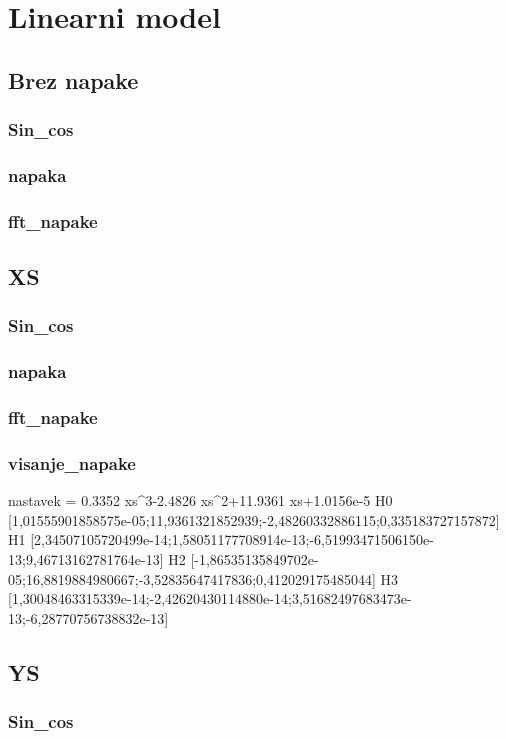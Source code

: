 \chapter{Linearni model}
\section{Brez napake}
\subsection{Sin\_cos}
\subsection{napaka}
\subsection{fft\_napake}
\section{XS}
\subsection{Sin\_cos}
\subsection{napaka}
\subsection{fft\_napake}
\subsection{visanje\_napake}
nastavek = 0.3352 xs^3-2.4826 xs^2+11.9361 xs+1.0156e-5
H0	[1,01555901858575e-05;11,9361321852939;-2,48260332886115;0,335183727157872]
H1	[2,34507105720499e-14;1,58051177708914e-13;-6,51993471506150e-13;9,46713162781764e-13]
H2	[-1,86535135849702e-05;16,8819884980667;-3,52835647417836;0,412029175485044]
H3	[1,30048463315339e-14;-2,42620430114880e-14;3,51682497683473e-13;-6,28770756738832e-13]





\section{YS}
\subsection{Sin\_cos}
